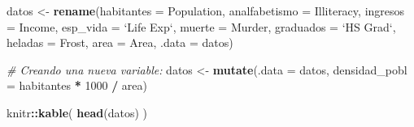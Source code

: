 \documentclass[]{article}
\newenvironment{Shaded}{\begin{snugshade}}{\end{snugshade}}
\newcommand{\KeywordTok}[1]{\textcolor[rgb]{0.13,0.29,0.53}{\textbf{#1}}}
\newcommand{\DataTypeTok}[1]{\textcolor[rgb]{0.13,0.29,0.53}{#1}}
\newcommand{\DecValTok}[1]{\textcolor[rgb]{0.00,0.00,0.81}{#1}}
\newcommand{\StringTok}[1]{\textcolor[rgb]{0.31,0.60,0.02}{#1}}
\newcommand{\CommentTok}[1]{\textcolor[rgb]{0.56,0.35,0.01}{\textit{#1}}}
\newcommand{\OperatorTok}[1]{\textcolor[rgb]{0.81,0.36,0.00}{\textbf{#1}}}
\newcommand{\NormalTok}[1]{#1}
\begin{document}
\begin{Shaded}
\begin{Highlighting}[]
\NormalTok{datos <-}\StringTok{ }\KeywordTok{rename}\NormalTok{(}\DataTypeTok{habitantes =}\NormalTok{ Population, }\DataTypeTok{analfabetismo =}\NormalTok{ Illiteracy,}
                \DataTypeTok{ingresos =}\NormalTok{ Income, }\DataTypeTok{esp_vida =} \StringTok{`}\DataTypeTok{Life Exp}\StringTok{`}\NormalTok{, }\DataTypeTok{muerte =}\NormalTok{ Murder, }\DataTypeTok{graduados =} \StringTok{`}\DataTypeTok{HS Grad}\StringTok{`}\NormalTok{, }\DataTypeTok{heladas =}\NormalTok{ Frost, }\DataTypeTok{area =}\NormalTok{ Area,}
                \DataTypeTok{.data =}\NormalTok{ datos)}

\CommentTok{# Creando una nueva variable:}
\NormalTok{datos <-}\StringTok{ }\KeywordTok{mutate}\NormalTok{(}\DataTypeTok{.data =}\NormalTok{ datos, }\DataTypeTok{densidad_pobl =}\NormalTok{ habitantes }\OperatorTok{*}\StringTok{ }\DecValTok{1000} \OperatorTok{/}\StringTok{ }\NormalTok{area)}

\NormalTok{knitr}\OperatorTok{::}\KeywordTok{kable}\NormalTok{(}
\KeywordTok{head}\NormalTok{(datos)}
\NormalTok{)}
\end{Highlighting}
\end{Shaded}
\end{document}
